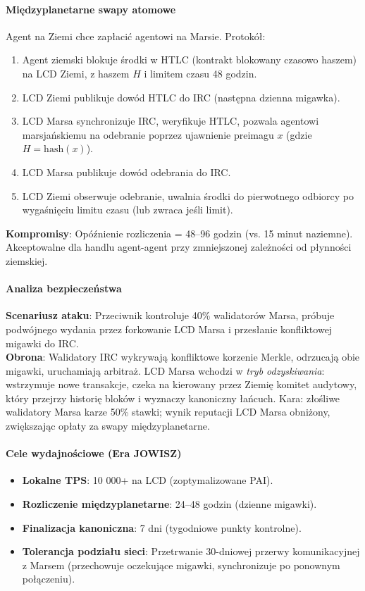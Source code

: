 \documentclass[11pt]{article}
\begin{document}
\paragraph{Międzyplanetarne swapy atomowe}
Agent na Ziemi chce zapłacić agentowi na Marsie. Protokół:
\begin{enumerate}[noitemsep]
  \item Agent ziemski blokuje środki w HTLC (kontrakt blokowany czasowo haszem) na LCD Ziemi, z haszem $H$ i limitem czasu 48 godzin.
  \item LCD Ziemi publikuje dowód HTLC do IRC (następna dzienna migawka).
  \item LCD Marsa synchronizuje IRC, weryfikuje HTLC, pozwala agentowi marsjańskiemu na odebranie poprzez ujawnienie preimagu $x$ (gdzie $H = \text{hash}(x)$).
  \item LCD Marsa publikuje dowód odebrania do IRC.
  \item LCD Ziemi obserwuje odebranie, uwalnia środki do pierwotnego odbiorcy po wygaśnięciu limitu czasu (lub zwraca jeśli limit).
\end{enumerate}
\textbf{Kompromisy}: Opóźnienie rozliczenia = 48--96 godzin (vs. 15 minut naziemne). Akceptowalne dla handlu agent-agent przy zmniejszonej zależności od płynności ziemskiej.

\paragraph{Analiza bezpieczeństwa}
\textbf{Scenariusz ataku}: Przeciwnik kontroluje 40\% walidatorów Marsa, próbuje podwójnego wydania przez forkowanie LCD Marsa i przesłanie konfliktowej migawki do IRC.\\
\textbf{Obrona}: Walidatory IRC wykrywają konfliktowe korzenie Merkle, odrzucają obie migawki, uruchamiają arbitraż. LCD Marsa wchodzi w \emph{tryb odzyskiwania}: wstrzymuje nowe transakcje, czeka na kierowany przez Ziemię komitet audytowy, który przejrzy historię bloków i wyznaczy kanoniczny łańcuch. Kara: złośliwe walidatory Marsa karze 50\% stawki; wynik reputacji LCD Marsa obniżony, zwiększając opłaty za swapy międzyplanetarne.

\paragraph{Cele wydajnościowe (Era JOWISZ)}
\begin{itemize}[noitemsep]
  \item \textbf{Lokalne TPS}: 10 000+ na LCD (zoptymalizowane PAI).
  \item \textbf{Rozliczenie międzyplanetarne}: 24--48 godzin (dzienne migawki).
  \item \textbf{Finalizacja kanoniczna}: 7 dni (tygodniowe punkty kontrolne).
  \item \textbf{Tolerancja podziału sieci}: Przetrwanie 30-dniowej przerwy komunikacyjnej z Marsem (przechowuje oczekujące migawki, synchronizuje po ponownym połączeniu).
\end{itemize}
\end{document}
